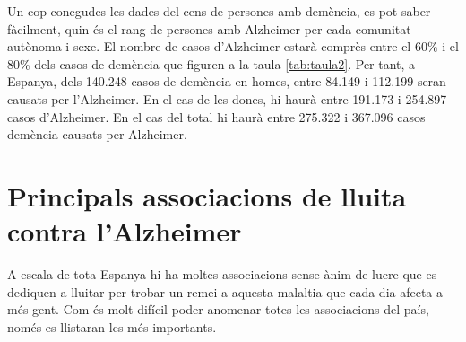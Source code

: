 \documentclass[a4paper,12pt]{report}
\begin{document}
\newpage
Un cop conegudes les dades del cens de persones amb demència, es pot saber fàcilment, quin és el rang de persones amb Alzheimer per cada comunitat autònoma i sexe. El nombre de casos d'Alzheimer estarà comprès entre el 60\% i el 80\% dels casos de demència que figuren a la taula \ref{tab:taula2}. Per tant, a Espanya, dels 140.248 casos de demència en homes, entre 84.149 i 112.199 seran causats per l'Alzheimer. En el cas de les dones, hi haurà entre  191.173 i 254.897 casos d'Alzheimer. En el cas del total hi haurà entre 275.322 i 367.096 casos demència causats per Alzheimer.
\section*{Principals associacions de lluita contra l'Alzheimer}
A escala de tota Espanya hi ha moltes associacions sense ànim de lucre que es dediquen a lluitar per trobar un remei a aquesta malaltia que cada dia afecta a més gent. Com és molt difícil poder anomenar totes les associacions del país, només es llistaran les més importants.
\end{document}
